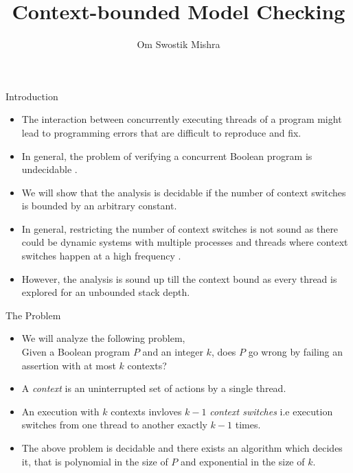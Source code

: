 \documentclass[10pt,notheorems]{beamer}
\title{Context-bounded Model Checking}
\subtitle{}
\date{}
\author{Om Swostik Mishra}
\institute{IIT Bombay}
\theoremstyle{plain} %
\begin{document}

\begin{frame}
    \maketitle
\end{frame}
\begin{frame}{Introduction}
    \begin{itemize}
        \nocite{qadeer2005context}
        \item The interaction between concurrently executing threads of a program might lead to programming 
        errors that are difficult to reproduce and fix.
        \item In general, the problem of verifying a concurrent Boolean program is undecidable \cite{ramalingam2000context}.
        \item We will show that the analysis is decidable if the number of context switches
        is bounded by an arbitrary constant.
        \item In general, restricting the number of context switches is not sound as there could be dynamic systems 
        with multiple processes and threads where context switches happen at a high frequency .
        \item However, the analysis is sound up till the context bound as every thread is explored for an 
        unbounded stack depth.
    \end{itemize}
\end{frame}
\begin{frame}{The Problem}
    \begin{itemize}
        \item We will analyze the following problem,\\
        Given a Boolean program $P$ and an integer $k$, does $P$ go wrong by failing an assertion with at most $k$
        contexts?
        \item A \textit{context} is an uninterrupted set of actions by a single thread.
        \item An execution with $k$ contexts invloves $k-1$ \textit{context switches} i.e execution 
        switches from one thread to another exactly $k-1$ times.
        \item The above problem is decidable and there exists an algorithm which decides it, that is polynomial in the size of 
        $P$ and exponential in the size of $k$.
    \end{itemize}
\end{frame}
\end{document}
